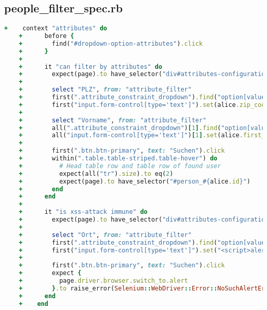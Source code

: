 \subsection{people\_filter\_spec.rb}
\begin{lstlisting}[language=Ruby]
    +    context "attributes" do
    +      before {
    +        find("#dropdown-option-attributes").click
    +      }
    +
    +      it "can filter by attributes" do
    +        expect(page).to have_selector("div#attributes-configuration")
    +
    +        select "PLZ", from: "attribute_filter"
    +        first(".attribute_constraint_dropdown").find("option[value='equal']").select_option
    +        first("input.form-control[type='text']").set(alice.zip_code)
    +
    +        select "Vorname", from: "attribute_filter"
    +        all(".attribute_constraint_dropdown")[1].find("option[value='equal']").select_option
    +        all("input.form-control[type='text']")[1].set(alice.first_name)
    +
    +        first(".btn.btn-primary", text: "Suchen").click
    +        within(".table.table-striped.table-hover") do
    +          # Head table row and table row of found user
    +          expect(all("tr").size).to eq(2)
    +          expect(page).to have_selector("#person_#{alice.id}")
    +        end
    +      end
    +
    +      it "is xss-attack immune" do
    +        expect(page).to have_selector("div#attributes-configuration")
    +
    +        select "Ort", from: "attribute_filter"
    +        first(".attribute_constraint_dropdown").find("option[value='match']").select_option
    +        first("input.form-control[type='text']").set("<script>alert('Hacked!');</script>")
    +
    +        first(".btn.btn-primary", text: "Suchen").click
    +        expect {
    +          page.driver.browser.switch_to.alert
    +        }.to raise_error(Selenium::WebDriver::Error::NoSuchAlertError)
    +      end
    +    end
\end{lstlisting}

\newpage


